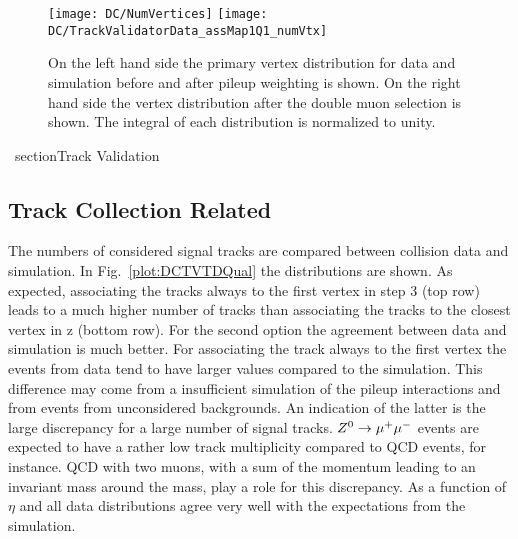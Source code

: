 \begin{figure}[h!b]
  \centering
  \texttt{[image: DC/NumVertices]}
  \texttt{[image: DC/TrackValidatorData\_assMap1Q1\_numVtx]}
  \caption[Vertex distribution for data and simulation before and after pileup weighting and after double muon trigger]{On the left hand side the primary vertex distribution for data and simulation before and after pileup weighting is shown. On the right hand side the vertex distribution after the double muon selection is shown. The integral of each distribution is normalized to unity. \label{plot:DCPW}}
\end{figure}

\ section{Track Validation \label{sec:DCTV}}

\subsection{Track Collection Related  \label{sec:DCTVTC}}

The numbers of considered signal tracks are compared between collision data and simulation. In Fig.~\ref{plot:DCTVTDQual} the distributions are shown. As expected, associating the tracks always to the first vertex in step 3 (top row) leads to a much higher number of tracks than associating the tracks to the closest vertex in z (bottom row). For the second option the agreement between data and simulation is much better. For associating the track always to the first vertex the events from data tend to have larger values compared to the simulation. This difference may come from a insufficient simulation of the pileup interactions and from events from unconsidered backgrounds. An indication of the latter is the large discrepancy for a large number of signal tracks. ${Z^{0}}\rightarrow\mu^+\mu^-$ events are expected to have a rather low track multiplicity compared to QCD events, for instance. QCD with two muons, with a sum of the momentum leading to an invariant mass around the \Zz{} mass, play a role for this discrepancy.  As a function of $\eta$ and \pt{} all data distributions agree very well with the expectations from the simulation.

